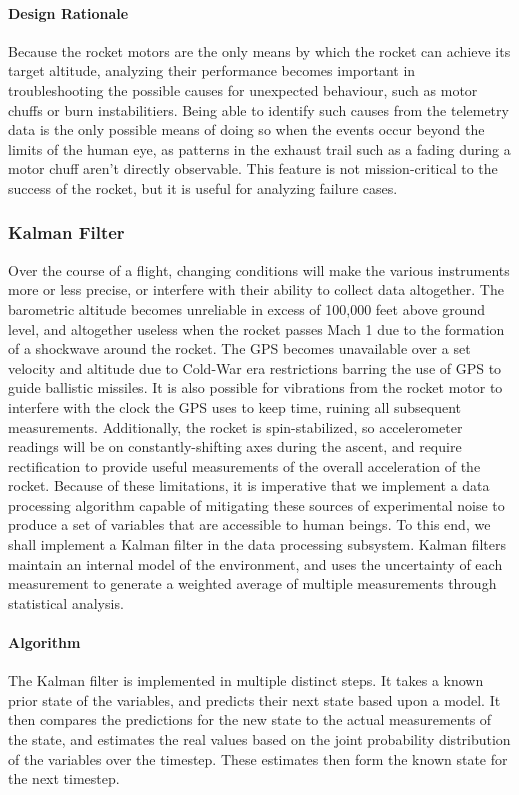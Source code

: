\documentclass[journal,10pt,onecolumn,compsoc]{IEEEtran}
\begin{document}
			\paragraph{Design Rationale}
				\noindent Because the rocket motors are the only means by which the rocket can achieve its target altitude, analyzing their performance becomes important in troubleshooting the possible causes for unexpected behaviour, such as motor chuffs or burn instabilitiers.
				Being able to identify such causes from the telemetry data is the only possible means of doing so when the events occur beyond the limits of the human eye, as patterns in the exhaust trail such as a fading during a motor chuff aren't directly observable.
				This feature is not mission-critical to the success of the rocket, but it is useful for analyzing failure cases.
				
		\subsubsection{Kalman Filter}
			\noindent Over the course of a flight, changing conditions will make the various instruments more or less precise, or interfere with their ability to collect data altogether.
			The barometric altitude becomes unreliable in excess of 100,000 feet above ground level, and altogether useless when the rocket passes Mach 1 due to the formation of a shockwave around the rocket.
			The GPS becomes unavailable over a set velocity and altitude due to Cold-War era restrictions barring the use of GPS to guide ballistic missiles.
			It is also possible for vibrations from the rocket motor to interfere with the clock the GPS uses to keep time, ruining all subsequent measurements.
			Additionally, the rocket is spin-stabilized, so accelerometer readings will be on constantly-shifting axes during the ascent, and require rectification to provide useful measurements of the overall acceleration of the rocket.
			Because of these limitations, it is imperative that we implement a data processing algorithm capable of mitigating these sources of experimental noise to produce a set of variables that are accessible to human beings.
			To this end, we shall implement a Kalman filter in the data processing subsystem.
			Kalman filters maintain an internal model of the environment, and uses the uncertainty of each measurement to generate a weighted average of multiple measurements through statistical analysis.
			
			\paragraph{Algorithm}
				\noindent The Kalman filter is implemented in multiple distinct steps.
				It takes a known prior state of the variables, and predicts their next state based upon a model.
				It then compares the predictions for the new state to the actual measurements of the state, and estimates the real values based on the joint probability distribution of the variables over the timestep.
				These estimates then form the known state for the next timestep.
				
\end{document}
